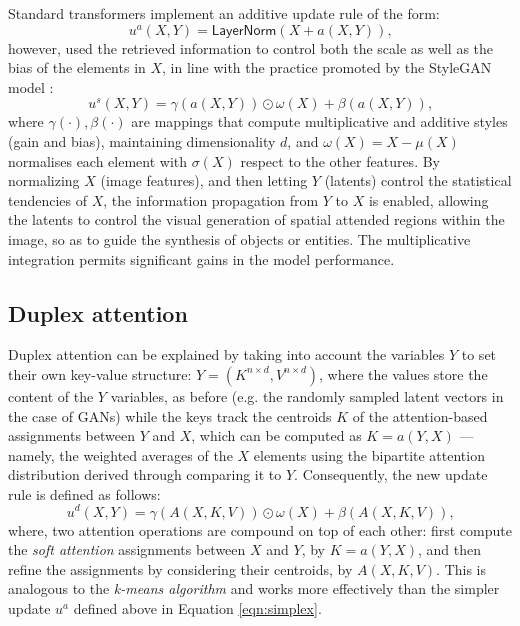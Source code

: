 \documentclass{article}
\begin{document}
	Standard transformers implement an additive update rule of the form:
	\begin{equation}
		\label{eqn:layernorm}
		u^a(X, Y)=\mathsf{LayerNorm}(X + a(X, Y)) \mbox{,}
	\end{equation}
	however, \cite{hudson2021generative} used the retrieved information to control both the scale as 
	well as the bias of the elements in $X$, in line with the practice promoted by the StyleGAN model 
	\cite{karras2019style}:
	\begin{equation}
		\label{eqn:simplex}
		u^s(X, Y)=\gamma (a(X, Y)) \odot \omega (X) + \beta (a(X, Y)) \mbox{,}
	\end{equation}
	where $\gamma(\cdot), \beta(\cdot)$ are mappings that compute multiplicative and additive styles 
	(gain and bias), maintaining dimensionality $d$, and $\omega (X) = X- \mu(X)$ normalises each 
	element with $\sigma(X)$ respect to the other features. By normalizing $X$ (image features), and 
	then letting $Y$ (latents) control the statistical tendencies of $X$, the information propagation from 
	$Y$ to $X$ is enabled, allowing the latents to control the visual generation of spatial attended 
	regions within the image, so as to guide the synthesis of objects or entities.
	The multiplicative integration permits significant gains in the model performance. 
	
	\subsection{Duplex attention}
	Duplex attention can be explained by taking into account the variables $Y$ to set their own 
	key-value structure: $Y = (K^{n\times d} , V^{n\times d})$, where the values store the content of the 
	$Y$ variables, as before (e.g. the randomly sampled latent vectors in the case of GANs) while the 
	keys track the centroids $K$ of the attention-based assignments between $Y$ and $X$, which can 
	be computed as $K = a(Y, X)$ — namely, the weighted averages of the $X$ elements using the 
	bipartite attention distribution derived through comparing it to $Y$. 
	Consequently, the new update rule is defined as follows:
	\begin{equation}
		\label{eqn:duplex}
		u^d(X, Y )=\gamma (A(X, K, V)) \odot \omega (X) + \beta (A(X, K, V)) \mbox{,}
	\end{equation}
	where, two attention operations are compound on top of each other: first compute the \textit{soft 
	attention} assignments between $X$ and $Y$, by $K = a(Y, X)$, and then refine the assignments by 
	considering their centroids, by $A(X, K, V)$. This is analogous to the \textit{k-means algorithm} and 
	works more effectively than the simpler update $u^a$ defined above in Equation \eqref{eqn:simplex}.
	
\end{document}
